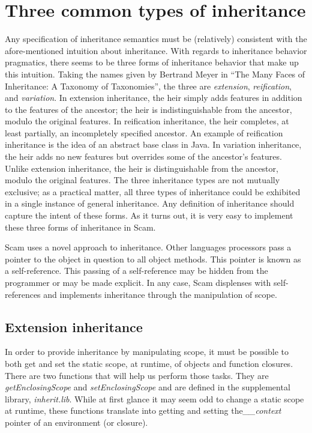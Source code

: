 \section{Three common types of inheritance}

Any specification of inheritance semantics must be (relatively)
consistent with the afore-mentioned intuition about inheritance.
With regards to inheritance behavior pragmatics, there seems to be three
forms of inheritance behavior that make up this intuition.  Taking the
names given by Bertrand Meyer in ``The Many Faces of Inheritance: 
A Taxonomy of Taxonomies'',
the three are {\it extension},
{\it reification}, and {\it variation}.  In extension inheritance,
the heir simply adds features in addition to the features of the
ancestor; the heir is indistinguishable from the ancestor, modulo the
original features.  In reification inheritance, the heir completes,
at least partially, an incompletely specified ancestor.  An example of
reification inheritance is the idea of an abstract base class in Java.
In variation inheritance, the heir adds no new features but overrides
some of the ancestor's features. Unlike extension inheritance, the heir
is distinguishable from the ancestor, modulo the original features. The
three inheritance types are not mutually exclusive; as a practical matter,
all three types of inheritance could be exhibited in a single instance
of general inheritance.  Any definition of inheritance should capture
the intent of these forms.
As it turns out, it is very easy to implement these three forms
of inheritance in Scam.

Scam uses a novel approach to inheritance. Other languages 
processors pass
a pointer to the object in question to all object methods.
This pointer is known as a self-reference. This passing of
a self-reference may be hidden from the programmer or may
be made explicit. In any case, Scam displenses with self-references
and implements inheritance through the manipulation of scope.

\subsection{Extension inheritance}

In order to provide inheritance by manipulating scope, it must be
possible to both get and set the static scope, at runtime, of objects
and function closures.  There are two functions that will help us
perform those tasks. They are
{\it getEnclosingScope} and {\it setEnclosingScope} and are defined
in the supplemental library, {\it inherit.lib}.
While at first
glance it may seem odd to change a static scope at runtime,
these functions translate into getting and setting
the{\it  \_\_context} pointer of an environment (or closure).

